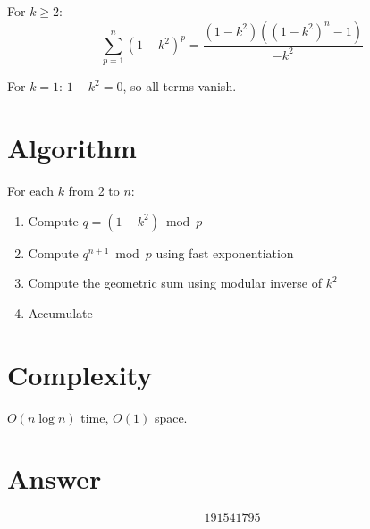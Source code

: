 \documentclass[12pt]{article}
\begin{document}
For $k \ge 2$:
\[
\sum_{p=1}^{n} (1-k^2)^p = \frac{(1-k^2)\left((1-k^2)^n - 1\right)}{-k^2}
\]

For $k = 1$: $1 - k^2 = 0$, so all terms vanish.

\section{Algorithm}
For each $k$ from 2 to $n$:
\begin{enumerate}
    \item Compute $q = (1 - k^2) \bmod p$
    \item Compute $q^{n+1} \bmod p$ using fast exponentiation
    \item Compute the geometric sum using modular inverse of $k^2$
    \item Accumulate
\end{enumerate}

\section{Complexity}
$O(n \log n)$ time, $O(1)$ space.

\section{Answer}

\[
\boxed{191541795}
\]
\end{document}
